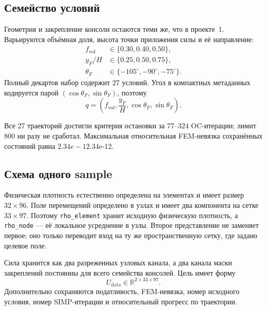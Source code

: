 \subsection{Семейство условий}
\label{subsec:practical-v04-condition-grid}

Геометрия и закрепление консоли остаются теми же, что в проекте~1. Варьируются объёмная доля, высота точки приложения силы и её направление:
\begin{equation}
\label{eq:practical-v04-condition-grid}
 \begin{aligned}
 f_{\mathrm{vol}}
 &\in\{0.30,0.40,0.50\},\\
 y_F/H
 &\in\{0.25,0.50,0.75\},\\
 \theta_F
 &\in\{-105^\circ,-90^\circ,-75^\circ\}.
 \end{aligned}
\end{equation}
Полный декартов набор содержит $27$ условий. Угол в компактных метаданных кодируется парой $(\cos\theta_F,\sin\theta_F)$, поэтому
\begin{equation}
 q=
 \left(
 f_{\mathrm{vol}},
 \frac{y_F}{H},
 \cos\theta_F,
 \sin\theta_F
 \right).
\end{equation}

Все 27 траекторий достигли критерия остановки за $77$--$324$ OC-итерации; лимит $800$ ни разу не сработал. Максимальная относительная FEM-невязка сохранённых состояний равна $2.34e-12$.34e-12.

\subsection{Схема одного sample}
\label{subsec:practical-v04-sample-schema}

Физическая плотность естественно определена на элементах и имеет размер $32\times96$. Поле перемещений определено в узлах и имеет два компонента на сетке $33\times97$. Поэтому \texttt{rho\_element} хранит исходную физическую плотность, а \texttt{rho\_node} --- её локальное усреднение в узлы. Второе представление не заменяет первое; оно только переводит вход на ту же пространственную сетку, где задано целевое поле.

Сила хранится как два разреженных узловых канала, а два канала маски закреплений постоянны для всего семейства консолей. Цель имеет форму
\begin{equation}
 U_{\mathrm{data}}
 \in
 \mathbb{R}^{2\times33\times97}.
\end{equation}
Дополнительно сохраняются податливость, FEM-невязка, номер исходного условия, номер SIMP-итерации и относительный прогресс по траектории.

